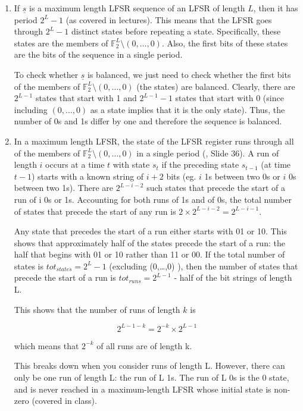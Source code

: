 \usepackage{amsfonts}

\begin{enumerate}

\item If $\underline{s}$ is a maximum length LFSR sequence of an LFSR of length
$L$, then it has period $2^L-1$ (as covered in lectures). This means that the
LFSR goes through $2^L-1$ distinct states before repeating a state.
Specifically, these states are the members of $\mathbb{F}_2^L \setminus
(0,\dots,0)$. Also, the first bits of these states are the bits of the sequence
in a single period.

To check whether $\underline{s}$ is balanced, we just need to check whether the
first bits of the members of $\mathbb{F}_2^L \setminus (0,\dots,0)$ (the states)
are balanced. Clearly, there are $2^{L-1}$ states that start with 1 and
$2^{L-1}-1$ states that start with 0 (since including $(0,\dots,0)$ as a state
implies that it is the only state). Thus, the number of 0s and 1s differ by one
and therefore the sequence is balanced.

\item In a maximum length LFSR, the state of the LFSR register runs through all
of the members of $\mathbb{F}_2^L \setminus (0,\dots,0)$ in a single period
(\cite{slides}, Slide 36). A run of length $i$ occurs at a time $t$ with state
$s_t$ if the preceding state $s_{t-1}$ (at time $t-1$) starts with a known
string of $i+2$ bits (eg. $i$ 1s between two 0s or $i$ 0s between two 1s). There
are $2^{L-i-2}$ such states that precede the start of a run of i 0s or 1s.
Accounting for both runs of 1s and of 0s, the total number of states that
precede the start of any run is $2 \times 2^{L-i-2} = 2^{L-i-1}$.

Any state that precedes the start of a run either starts with 01 or 10. This
shows that approximately half of the states precede the start of a run: the half
that begins with 01 or 10 rather than 11 or 00. If the total number of states is
$tot_{states} = 2^L-1$ (excluding (0,\dots,0) ), then the number of states that
precede the start of a run is $tot_{runs} = 2^{L-1}$ - half of the bit strings
of length L.

This shows that the number of runs of length $k$ is

\[2^{L-1-k} = 2^{-k} \times 2^{L-1}\]

which means that $2^{-k}$ of all runs are of length k.

This breaks down when you consider runs of length L. However, there can only be
one run of length L: the run of L 1s. The run of L 0s is the 0 state, and is
never reached in a maximum-length LFSR whose initial state is non-zero (covered
in class).

\end{enumerate}

